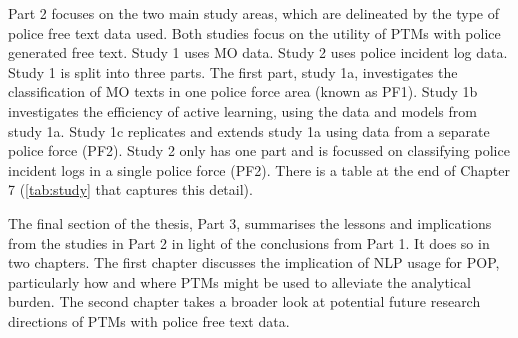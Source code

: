 Part 2 focuses on the two main study areas, which are delineated by the type of police free text data used. Both studies focus on the utility of PTMs with police generated free text. Study 1 uses MO data. Study 2 uses police incident log data. Study 1 is split into three parts. The first part, study 1a, investigates the classification of MO texts in one police force area (known as PF1). Study 1b investigates the efficiency of active learning, using the data and models from study 1a. Study 1c replicates and extends study 1a using data from a separate police force (PF2). Study 2 only has one part and is focussed on classifying police incident logs in a single police force (PF2). There is a table at the end of Chapter 7 (\ref{tab:study} that captures this detail).

The final section of the thesis, Part 3, summarises the lessons and implications from the studies in Part 2 in light of the conclusions from Part 1. It does so in two chapters. The first chapter discusses the implication of NLP usage for POP, particularly how and where PTMs might be used to alleviate the analytical burden. The second chapter takes a broader look at potential future research directions of PTMs with police free text data.




